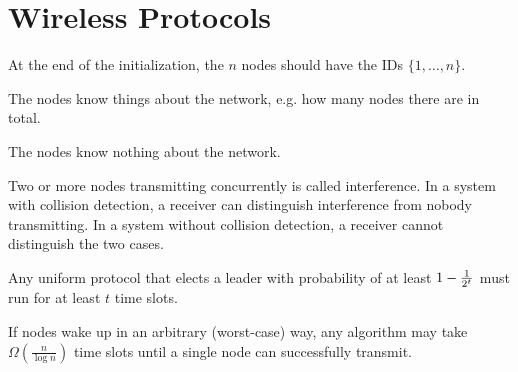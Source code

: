 \documentclass[11pt, oneside]{book}   						%
\begin{document}
\section{Wireless Protocols}
\begin{mydef}[Initialization] At the end of the initialization, the $n$ nodes should have the IDs $\{1,\hdots, n\}$.\end{mydef}
\begin{mydef} The nodes know things about the network, e.g. how many nodes there are in total.\end{mydef}
\begin{mydef} The nodes know nothing about the network.\end{mydef}
\begin{mydef} Two or more nodes transmitting concurrently is called interference. In a system with collision detection, a receiver can distinguish interference from nobody transmitting. In a system without collision detection, a receiver cannot distinguish the two cases.\end{mydef}
\begin{mythm}Any uniform protocol that elects a leader with probability of at least $1-\frac{1}{2^t}$ must run for at least $t$ time slots.\end{mythm}
\begin{mythm} If nodes wake up in an arbitrary (worst-case) way, any algorithm may take $\Omega(\frac{n}{\log n})$ time slots until a single node can successfully transmit.\end{mythm}

\end{document}
